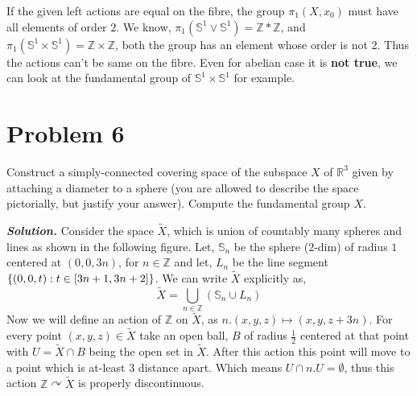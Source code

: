 \documentclass[11pt]{article}
\newcommand{\bb}[1]{\mathbb{#1}}
\newcommand{\Z}{\bb{Z}}
\newcommand{\R}{\mathbb{R}}
\newcommand{\s}{\bb{S}}
\newcommand{\sol}{ \textbf{\textit{Solution.}} }
\begin{document}
If the given left actions are equal on the fibre, the group $\pi_1(X,x_0)$ must have all elements of order $2$. We know, $\pi_1(\s^1\vee \s^1) = \Z \ast \Z$, and $\pi_1(\s^1 \times \s^1) = \Z \times \Z$, both the group has an element whose order is not $2$. Thus the actions can't be same on the fibre. Even for abelian case it is \textbf{\textsf{ not true}}, we can look at the fundamental group of $\s^1 \times \s^1$ for example. 

\pagebreak 

\section{Problem 6}
\begin{prob}{}{}
    Construct a simply-connected covering space of the subspace $X$ of $\R^3$ given by attaching a diameter to a sphere (you are allowed to describe the space pictorially, but justify your answer). Compute the fundamental group $X$.
\end{prob}
\sol Consider the space $\tilde{X}$, which is union of countably many spheres and lines as shown in the following figure. Let, $\s_n$ be the sphere ($2$-dim) of radius $1$ centered at $(0,0,3n)$, for $n \in \Z$ and let, $L_n$ be the line segment $\qty{(0,0,t) : t \in [3n+1,3n+2]}$. We can write $\tilde{X}$ explicitly as,  $$\tilde{X}= \bigcup_{n \in \Z} (\s_n\cup L_n)$$ 
Now we will define an action of $\Z$ on $\tilde{X}$, as $n.(x,y,z) \mapsto (x,y,z+3n)$. For every point $(x,y,z) \in \tilde{X}$ take an open ball, $B$ of radius $\frac{1}{2}$ centered at that point with $U = \tilde{X} \cap B$ being the open set in $\tilde{X}$. After this action this point will move to a point which is at-least $3$ distance apart. Which means $U \cap n.U =\emptyset$, thus this action $\Z \curvearrowright \tilde{X}$ is properly discontinuous. 
\end{document}
